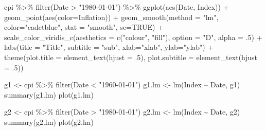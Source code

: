 \documentclass[
]{article}
\newenvironment{Shaded}{\begin{snugshade}}{\end{snugshade}}
\newcommand{\AttributeTok}[1]{\textcolor[rgb]{0.77,0.63,0.00}{#1}}
\newcommand{\ConstantTok}[1]{\textcolor[rgb]{0.00,0.00,0.00}{#1}}
\newcommand{\DecValTok}[1]{\textcolor[rgb]{0.00,0.00,0.81}{#1}}
\newcommand{\FunctionTok}[1]{\textcolor[rgb]{0.00,0.00,0.00}{#1}}
\newcommand{\NormalTok}[1]{#1}
\newcommand{\OtherTok}[1]{\textcolor[rgb]{0.56,0.35,0.01}{#1}}
\newcommand{\SpecialCharTok}[1]{\textcolor[rgb]{0.00,0.00,0.00}{#1}}
\newcommand{\StringTok}[1]{\textcolor[rgb]{0.31,0.60,0.02}{#1}}
\begin{document}
\begin{Shaded}
\begin{Highlighting}[]
\NormalTok{cpi }\SpecialCharTok{\%\textgreater{}\%} 
  \FunctionTok{filter}\NormalTok{(Date }\SpecialCharTok{\textgreater{}} \StringTok{"1980{-}01{-}01"}\NormalTok{) }\SpecialCharTok{\%\textgreater{}\%} 
  \FunctionTok{ggplot}\NormalTok{(}\FunctionTok{aes}\NormalTok{(Date, Index)) }\SpecialCharTok{+} \FunctionTok{geom\_point}\NormalTok{(}\FunctionTok{aes}\NormalTok{(}\AttributeTok{color=}\NormalTok{Inflation)) }\SpecialCharTok{+} 
  \FunctionTok{geom\_smooth}\NormalTok{(}\AttributeTok{method =} \StringTok{"lm"}\NormalTok{, }\AttributeTok{color=}\StringTok{"cadetblue"}\NormalTok{, }\AttributeTok{stat =} \StringTok{"smooth"}\NormalTok{, }\AttributeTok{se=}\ConstantTok{TRUE}\NormalTok{) }\SpecialCharTok{+}
  \FunctionTok{scale\_color\_viridis\_c}\NormalTok{(}\AttributeTok{aesthetics =} \FunctionTok{c}\NormalTok{(}\StringTok{"colour"}\NormalTok{, }\StringTok{"fill"}\NormalTok{), }\AttributeTok{option =} \StringTok{"D"}\NormalTok{, }\AttributeTok{alpha =}\NormalTok{ .}\DecValTok{5}\NormalTok{) }\SpecialCharTok{+} 
  \FunctionTok{labs}\NormalTok{(}\AttributeTok{title =} \StringTok{"Title"}\NormalTok{, }\AttributeTok{subtitle =} \StringTok{"sub"}\NormalTok{, }\AttributeTok{xlab=}\StringTok{"xlab"}\NormalTok{, }\AttributeTok{ylab=}\StringTok{"ylab"}\NormalTok{) }\SpecialCharTok{+} 
  \FunctionTok{theme}\NormalTok{(}\AttributeTok{plot.title =} \FunctionTok{element\_text}\NormalTok{(}\AttributeTok{hjust =}\NormalTok{ .}\DecValTok{5}\NormalTok{), }\AttributeTok{plot.subtitle =} \FunctionTok{element\_text}\NormalTok{(}\AttributeTok{hjust =}\NormalTok{ .}\DecValTok{5}\NormalTok{))}
\end{Highlighting}
\end{Shaded}

\begin{Shaded}
\begin{Highlighting}[]
\NormalTok{g1 }\OtherTok{\textless{}{-}}\NormalTok{ cpi }\SpecialCharTok{\%\textgreater{}\%} 
  \FunctionTok{filter}\NormalTok{(Date }\SpecialCharTok{\textless{}} \StringTok{"1960{-}01{-}01"}\NormalTok{)}
\NormalTok{g1.lm }\OtherTok{\textless{}{-}} \FunctionTok{lm}\NormalTok{(Index }\SpecialCharTok{\textasciitilde{}}\NormalTok{ Date, g1)}
\FunctionTok{summary}\NormalTok{(g1.lm)}
\FunctionTok{plot}\NormalTok{(g1.lm)}
\end{Highlighting}
\end{Shaded}

\begin{Shaded}
\begin{Highlighting}[]
\NormalTok{g2 }\OtherTok{\textless{}{-}}\NormalTok{ cpi }\SpecialCharTok{\%\textgreater{}\%} 
  \FunctionTok{filter}\NormalTok{(Date }\SpecialCharTok{\textgreater{}} \StringTok{"1980{-}01{-}01"}\NormalTok{)  }
\NormalTok{g2.lm }\OtherTok{\textless{}{-}} \FunctionTok{lm}\NormalTok{(Index }\SpecialCharTok{\textasciitilde{}}\NormalTok{ Date, g2)}
\FunctionTok{summary}\NormalTok{(g2.lm)}
\FunctionTok{plot}\NormalTok{(g2.lm)}
\end{Highlighting}
\end{Shaded}
\end{document}
